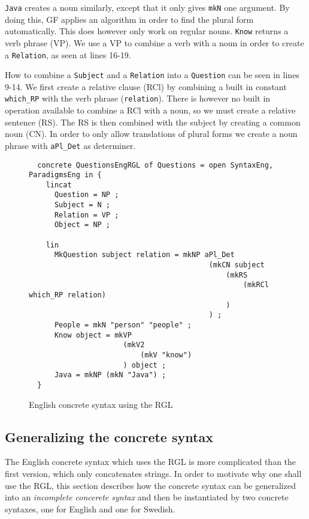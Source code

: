 \texttt{Java} creates a noun similarly, except that it only gives \texttt{mkN} one argument. By doing this, GF applies an algorithm in order to find the plural form automatically. This does however only work on regular nouns. \texttt{Know} returns a verb phrase (VP). We use a VP to combine a verb with a noun in order to create a \texttt{Relation}, as seen at lines 16-19. 

How to combine a \texttt{Subject} and a \texttt{Relation} into a \texttt{Question} can be seen in lines 9-14. We first create a relative clause (RCl) by combining a built in constant \texttt{which\_RP} with the verb phrase (\texttt{relation}). There is however no built in operation available to combine a RCl with a noun, so we must create a relative sentence (RS). The RS is then combined with the subject by creating a common noun (CN). In order to only allow translations of plural forms we create a noun phrase with \texttt{aPl\_Det} as determiner.

\begin{figure}[h]
\begin{verbatim}
  concrete QuestionsEngRGL of Questions = open SyntaxEng, ParadigmsEng in {
    lincat
      Question = NP ;
      Subject = N ;
      Relation = VP ;
      Object = NP ;

    lin
      MkQuestion subject relation = mkNP aPl_Det 
                                          (mkCN subject 
                                              (mkRS 
                                                  (mkRCl which_RP relation)
                                              )
                                          ) ;
      People = mkN "person" "people" ;
      Know object = mkVP 
                      (mkV2 
                          (mkV "know")
                      ) object ;
      Java = mkNP (mkN "Java") ;
  }
\end{verbatim}
\caption{English concrete syntax using the RGL}
\end{figure}

\subsection{Generalizing the concrete syntax}

The English concrete syntax which uses the RGL is more complicated than the first version, which only concatenates strings. In order to motivate why one shall use the RGL, this section describes how the concrete syntax can be generalized into an \emph{incomplete concerete syntax} and then be instantiated by two concrete syntaxes, one for English and one for Swedish.